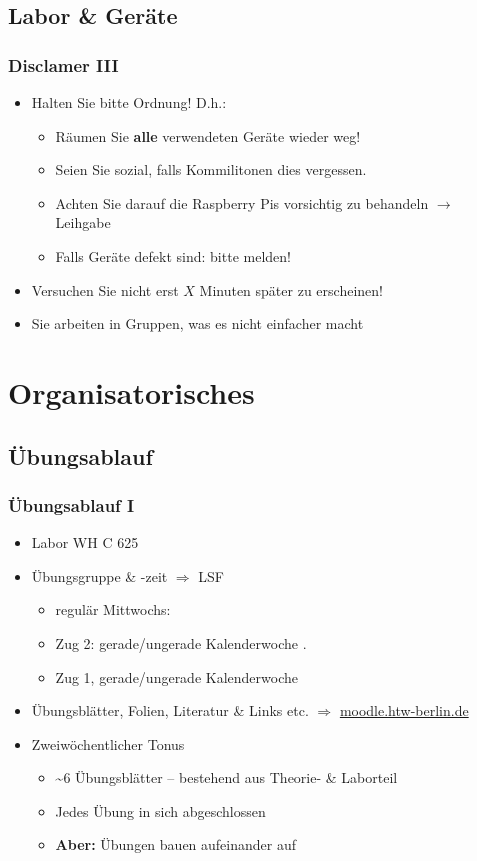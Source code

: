 \documentclass[xcolor=dvipsnames,aspectratio=169]{beamer}
\begin{document}
\subsection{Labor \& Geräte}
\begin{frame}
	\frametitle{Disclamer III}
	\begin{itemize}
		\item Halten Sie bitte Ordnung! D.h.:
		\begin{itemize}
			\item Räumen Sie \textbf{alle} verwendeten Geräte wieder weg!
			\item Seien Sie sozial, falls Kommilitonen dies vergessen.
			\item Achten Sie darauf die Raspberry Pis vorsichtig zu behandeln $\rightarrow$ Leihgabe
			\item Falls Geräte defekt sind: bitte melden!
		\end{itemize}
		\item Versuchen Sie nicht erst $X$ Minuten später zu erscheinen! 
		\item Sie arbeiten in Gruppen, was es nicht einfacher macht
	\end{itemize}
\end{frame}

\section{Organisatorisches}
\subsection{Übungsablauf}
\begin{frame}
	\frametitle{Übungsablauf I}
	\begin{itemize}
		\item Labor WH C 625
		\item Übungsgruppe \& -zeit $\Rightarrow$ LSF
		\begin{itemize}
			\item regulär Mittwochs: 
			\item Zug 2: gerade/ungerade Kalenderwoche .
			\item Zug 1, gerade/ungerade Kalenderwoche 
		\end{itemize}
		\item Übungsblätter, Folien, Literatur \& Links etc. $\Rightarrow$ \url{moodle.htw-berlin.de}
		\item Zweiwöchentlicher Tonus 
		\begin{itemize}
			\item \textasciitilde 6 Übungsblätter -- bestehend aus Theorie- \& Laborteil
			\item Jedes Übung in sich abgeschlossen
			\item \textbf{Aber:} Übungen bauen aufeinander auf
		\end{itemize}
	\end{itemize}
\end{frame}
\end{document}
